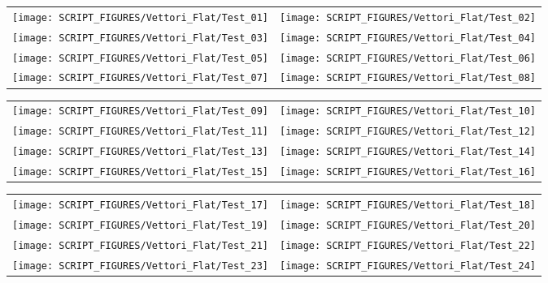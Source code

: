 \begin{figure}[p]
\begin{tabular*}{\textwidth}{l@{\extracolsep{\fill}}r}
\texttt{[image: SCRIPT\_FIGURES/Vettori\_Flat/Test\_01]} &
\texttt{[image: SCRIPT\_FIGURES/Vettori\_Flat/Test\_02]} \\
\texttt{[image: SCRIPT\_FIGURES/Vettori\_Flat/Test\_03]} &
\texttt{[image: SCRIPT\_FIGURES/Vettori\_Flat/Test\_04]} \\
\texttt{[image: SCRIPT\_FIGURES/Vettori\_Flat/Test\_05]} &
\texttt{[image: SCRIPT\_FIGURES/Vettori\_Flat/Test\_06]} \\
\texttt{[image: SCRIPT\_FIGURES/Vettori\_Flat/Test\_07]} &
\texttt{[image: SCRIPT\_FIGURES/Vettori\_Flat/Test\_08]} \\
\end{tabular*}
\label{Vettori_Plume_Temperature}
\end{figure}

\begin{figure}[p]
\begin{tabular*}{\textwidth}{l@{\extracolsep{\fill}}r}
\texttt{[image: SCRIPT\_FIGURES/Vettori\_Flat/Test\_09]} &
\texttt{[image: SCRIPT\_FIGURES/Vettori\_Flat/Test\_10]} \\
\texttt{[image: SCRIPT\_FIGURES/Vettori\_Flat/Test\_11]} &
\texttt{[image: SCRIPT\_FIGURES/Vettori\_Flat/Test\_12]} \\
\texttt{[image: SCRIPT\_FIGURES/Vettori\_Flat/Test\_13]} &
\texttt{[image: SCRIPT\_FIGURES/Vettori\_Flat/Test\_14]} \\
\texttt{[image: SCRIPT\_FIGURES/Vettori\_Flat/Test\_15]} &
\texttt{[image: SCRIPT\_FIGURES/Vettori\_Flat/Test\_16]} \\
\end{tabular*}
\label{Vettori_2}
\end{figure}

\begin{figure}[p]
\begin{tabular*}{\textwidth}{l@{\extracolsep{\fill}}r}
\texttt{[image: SCRIPT\_FIGURES/Vettori\_Flat/Test\_17]} &
\texttt{[image: SCRIPT\_FIGURES/Vettori\_Flat/Test\_18]} \\
\texttt{[image: SCRIPT\_FIGURES/Vettori\_Flat/Test\_19]} &
\texttt{[image: SCRIPT\_FIGURES/Vettori\_Flat/Test\_20]} \\
\texttt{[image: SCRIPT\_FIGURES/Vettori\_Flat/Test\_21]} &
\texttt{[image: SCRIPT\_FIGURES/Vettori\_Flat/Test\_22]} \\
\texttt{[image: SCRIPT\_FIGURES/Vettori\_Flat/Test\_23]} &
\texttt{[image: SCRIPT\_FIGURES/Vettori\_Flat/Test\_24]} \\
\end{tabular*}
\label{Vettori_3}
\end{figure}

